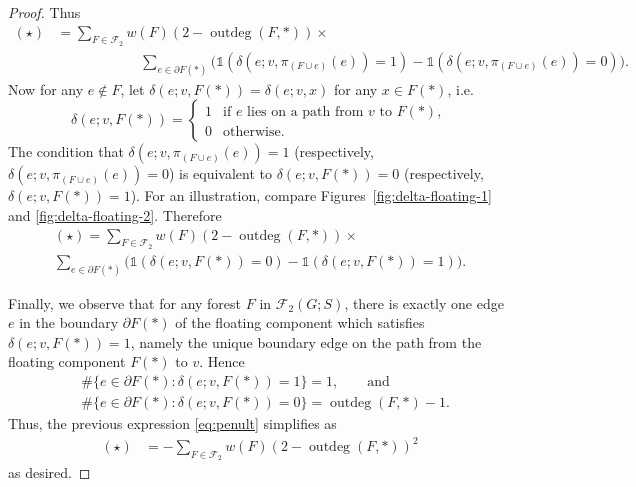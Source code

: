 \documentclass[12pt]{amsart}
\theoremstyle{definition}
\newcommand{\one}{\mathds{1}}
\newcommand{\forests}{\mathcal{F}}
\DeclareMathOperator{\outdeg}{outdeg}
\begin{document}
\begin{proof}
Thus
\begin{align*}
	(\star) 
	&= \sum_{F \in \forests_2} w({F}) (2 - \outdeg(F, *)) \times \\
	& \qquad\qquad\qquad   \sum_{e \in \partial F(*)} \Big( \one(\delta(e; v, \pi_{(F \cup e)}(e)) = 1) - \one(\delta(e; v, \pi_{(F \cup e)}(e)) = 0) \Big) .
\end{align*}
Now for any $e \not\in F$, let $\delta(e; v, F(*)) = \delta(e; v, x)$ for any $x \in F(*)$, i.e.
\[
	\delta(e; v, F(*)) = \begin{cases}
	1 &\text{if $e$ lies on a path from $v$ to $F(*)$}, \\
	0 &\text{otherwise}.
	\end{cases}
\]
The condition that $\delta(e; v, \pi_{(F \cup e)}(e)) = 1$ (respectively, $\delta(e; v, \pi_{(F \cup e)}(e)) = 0$)
is equivalent to ${\delta(e; v, F(*)) = 0}$ (respectively, ${\delta(e; v, F(*)) = 1}$).
For an illustration, compare Figures~\ref{fig:delta-floating-1} and \ref{fig:delta-floating-2}.
Therefore
\begin{multline}\label{eq:penult}
	(\star) 
	= \sum_{F \in \forests_2} w({F}) (2 - \outdeg(F, *)) \times  \\
	\sum_{e \in \partial F(*)} \Big( \one(\delta(e; v, F(*)) = 0) - \one(\delta(e; v, F(*)) = 1) \Big) .
\end{multline}

Finally, we observe that for any forest $F$ in $\forests_2(G;S)$,
there is exactly one edge $e$ in the boundary $\partial F(*)$ of the floating component which satisfies $\delta(e; v, F(*)) = 1$, namely the unique boundary edge on the path from the floating component $F(*)$ to $v$.
Hence
\begin{align*}
	&\#\{e \in \partial F(*) \colon \delta(e;v, F(*)) = 1 \} = 1,
\qquad\text{and}\qquad \\
	&\#\{e \in \partial F(*) \colon \delta(e;v, F(*)) = 0 \} = \outdeg(F,*) - 1 .
\end{align*}
Thus, the previous expression \eqref{eq:penult} simplifies as
\begin{align*}
	(\star) 
	&= - \!\sum_{F \in \forests_2} w({F}) (2 - \outdeg(F,*))^2 
\end{align*}
as desired.
\end{proof}
\end{document}
